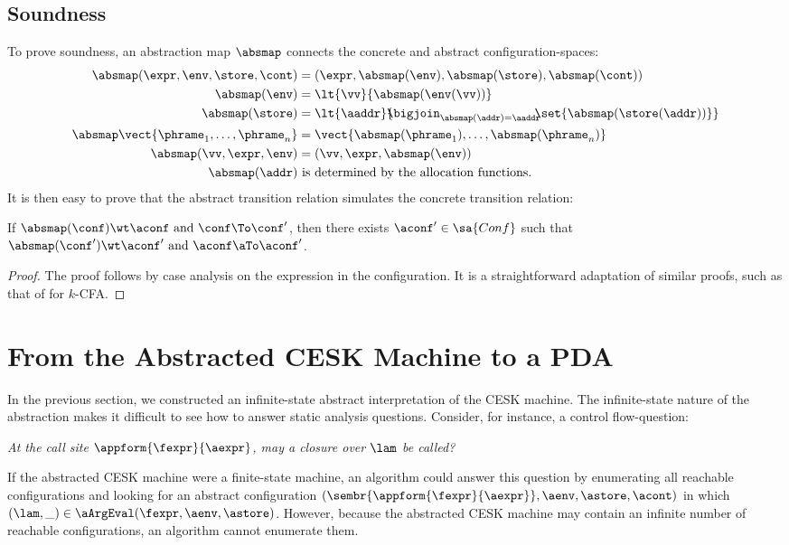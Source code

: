  \subsection{Soundness}

  To prove soundness,  an abstraction map $\absmap$ connects the
  concrete and abstract configuration-spaces:
  \begin{align*}
\absmap(\expr,\env,\store,\cont) &= (\expr,\absmap(\env),\absmap(\store),\absmap(\cont))
  \\
    \absmap(\env) &= \lt{\vv}{\absmap(\env(\vv))}
    \\
      \absmap(\store) &= \lt{\aaddr}{\!\!\! \bigjoin_{\absmap(\addr) = \aaddr} \!\!\! \set{\absmap(\store(\addr))}}
      \\
        \absmap\vect{\phrame_1,\ldots,\phrame_n} &= \vect{\absmap(\phrame_1), \ldots, \absmap(\phrame_n)}
        \\
          \absmap(\vv,\expr,\env) &= (\vv,\expr,\absmap(\env))
          \\
            \absmap(\addr) &\text{ is determined by the allocation functions}
            \text.
            \end{align*}
It is then easy to prove that the abstract transition relation
            simulates the concrete transition relation:
            \begin{theorem}
If $\absmap(\conf) \wt \aconf \text{ and } \conf \To \conf'$, then
there exists $\aconf' \in \sa{Conf}$ such that $\absmap(\conf')
\wt \aconf' \text{ and } \aconf \aTo \aconf'$.
  \end{theorem}
  \begin{proof}
  The proof follows by case analysis on the
  expression in the configuration.
It is a straightforward adaptation of similar proofs, such as that of
  \citet{mattmight:Might:2007:Dissertation} for $k$-CFA.
  \end{proof}




\section{From the Abstracted CESK Machine
  to a PDA}
\label{sec:pda}
In the previous section, we constructed an infinite-state abstract
interpretation of the CESK machine.
The infinite-state nature of the abstraction makes it difficult to see how
to answer static analysis questions.
Consider, for instance, a control flow-question:
\begin{center}
\emph{  At the call site $\appform{\fexpr}{\aexpr}$, may a closure over
  $\lam$ be called?}
\end{center}
If the abstracted CESK machine were a finite-state machine, an
algorithm could answer this question by enumerating all reachable
configurations and looking for an abstract configuration
$(\sembr{\appform{\fexpr}{\aexpr}},\aenv,\astore,\acont)$ in which
$(\lam,\_) \in \aArgEval(\fexpr,\aenv,\astore)$.
However, because the abstracted CESK machine may contain an infinite
number of reachable configurations, an algorithm cannot enumerate
them.


